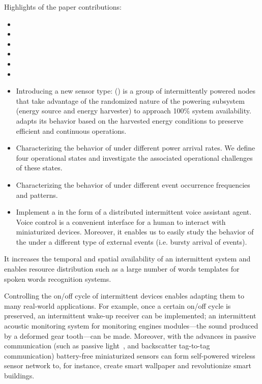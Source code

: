 Highlights of the paper contributions:
\begin{itemize}
		\item{}
		\item{}
		\item{}
		\item{}
		\item{}
		\item{}
		\item Introducing a new sensor type: \textit{\fullsys} (\sys) is a group of intermittently powered nodes that take advantage of the randomized nature of the powering subsystem (energy source and energy harvester) to approach 100\% system availability. \sys adapts its behavior based on the harvested energy conditions to preserve efficient and continuous operations. 
		\item Characterizing the behavior of \fullsys under different power arrival rates. We define four \sys operational states and investigate the associated operational challenges of these states. 
		\item Characterizing the behavior of \fullsys under different event occurrence frequencies and patterns. 
		\item Implement a \fullsys in the form of a distributed intermittent voice assistant agent. Voice control is a convenient interface for a human to interact with miniaturized devices. Moreover, it enables us to easily study the behavior of the \sys under a different type of external events (i.e. bursty arrival of events).
\end{itemize}





%
 It increases the temporal and spatial availability of an intermittent system and enables resource distribution such as a large number of words templates for spoken words recognition systems. 

Controlling the on/off cycle of intermittent devices enables adapting them to many real-world applications. For example, once a certain on/off cycle is preserved, an intermittent wake-up receiver can be implemented; an intermittent acoustic monitoring system for monitoring engines modules---the sound produced by a deformed gear tooth---can be made. Moreover, with the advances in passive communication (such as passive light~\cite{}, and backscatter tag-to-tag~\cite{liu2013ambient} communication) battery-free miniaturized sensors can form self-powered wireless sensor network to, for instance, create smart wallpaper and revolutionize smart buildings. 

